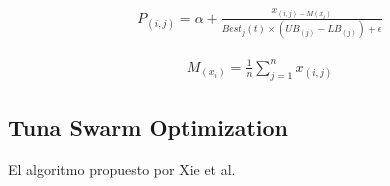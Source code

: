 \documentclass[conference]{IEEEtran}
\begin{document}
\begin{equation}
\begin{gathered}
P_{(i,j)}=\alpha + \frac{x_{(i,j) - M(x_i)}}{Best_j(t) \times (UB_{(j)}-LB_{(j)})+\epsilon} 
\end{gathered}
\label{eq38}
\end{equation}

\begin{equation}
\begin{gathered}
M_{(x_i)} = \frac{1}{n} \sum_{j=1}^{n} x_{(i,j)}
\end{gathered}
\label{eq39}
\end{equation}

\subsection{Tuna Swarm Optimization}

\noindent El algoritmo propuesto por Xie et al.~\cite{Xie2021}




    
\end{document}
